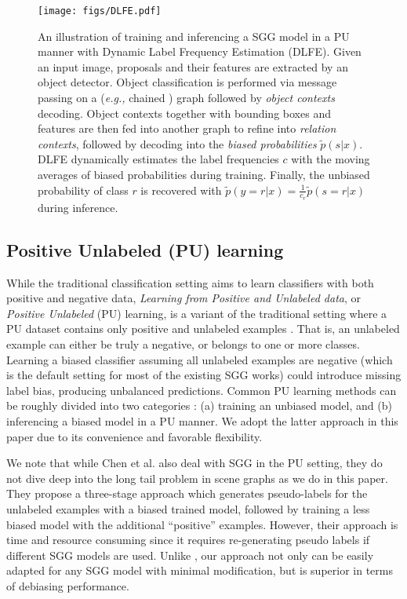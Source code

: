 \documentclass[sigconf]{acmart}
\begin{document}
\begin{figure*}[t!]
\begin{center}
\texttt{[image: figs/DLFE.pdf]}
\end{center}
\vspace{-1em}
  \caption{
  An illustration of training and inferencing a SGG model in a PU manner with Dynamic Label Frequency Estimation (DLFE).
  Given an input image, proposals and their features are extracted by an object detector. 
  Object classification is performed via message passing on a (\emph{e.g.,} chained \cite{zellers2018neural}) graph followed by \textit{object contexts} decoding.
  Object contexts together with bounding boxes and features are then fed into another graph to refine into \textit{relation contexts}, followed by decoding into the \textit{biased probabilities} $\tilde{p}(s|x)$.
  DLFE dynamically estimates the label frequencies $c$ with the moving averages of biased probabilities during training.
  Finally, the unbiased probability of class $r$ is recovered with $\tilde{p}(y=r|x)=\frac{1}{c_r} \tilde{p}(s=r|x)$ during inference.
    }
\label{fig:dlfe}
\vspace{-0.7em}
\end{figure*}

\subsection{Positive Unlabeled (PU) learning}
While the traditional classification setting aims to learn classifiers with both positive and negative data, \textit{Learning from Positive and Unlabeled data}, or \textit{Positive Unlabeled} (PU) learning, is a variant of the traditional setting where a PU dataset contains only positive and unlabeled examples \cite{denis2005learning,elkan2008learning,bekker2020learning}.
That is, an unlabeled example can either be truly a negative, or belongs to one or more classes.
Learning a biased classifier assuming all unlabeled examples are negative (which is the default setting for most of the existing SGG works) could introduce missing label bias, producing unbalanced predictions.
Common PU learning methods can be roughly divided into two categories \cite{bekker2020learning}: (a) training an unbiased model, and (b) inferencing a biased model in a PU manner.
We adopt the latter approach in this paper due to its convenience and favorable flexibility.

We note that while Chen et al. \cite{chen2019soft} also deal with SGG in the PU setting, they do not dive deep into the long tail problem in scene graphs as we do in this paper.
They propose a three-stage approach which generates pseudo-labels for the unlabeled examples with a biased trained model, followed by training a less biased model with the additional ``positive'' examples.
However, their approach is time and resource consuming since it requires re-generating pseudo labels if different SGG models are used.
Unlike \cite{chen2019soft}, our approach not only can be easily adapted for any SGG model with minimal modification, but is superior in terms of debiasing performance.
\end{document}
